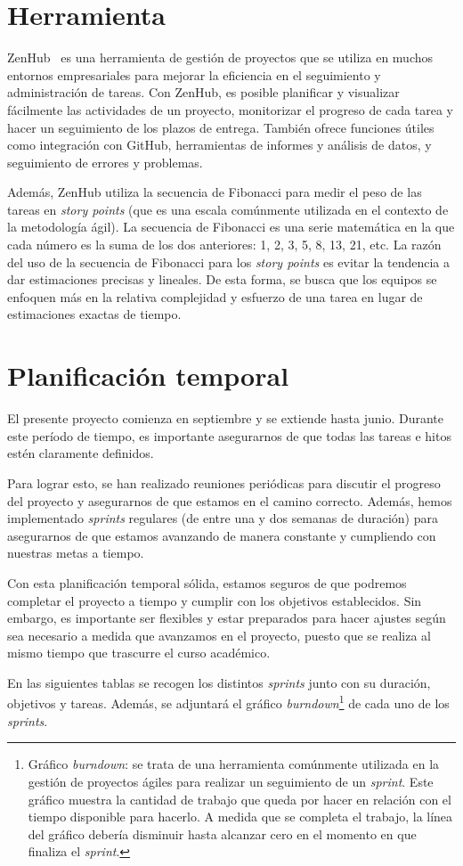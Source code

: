 \section{Herramienta}
ZenHub~\cite{Zenhub} es una herramienta de gestión de proyectos que se utiliza en muchos entornos empresariales para mejorar la eficiencia en el seguimiento y administración de tareas. Con ZenHub, es posible planificar y visualizar fácilmente las actividades de un proyecto, monitorizar el progreso de cada tarea y hacer un seguimiento de los plazos de entrega. También ofrece funciones útiles como integración con GitHub, herramientas de informes y análisis de datos, y seguimiento de errores y problemas.

Además, ZenHub utiliza la secuencia de Fibonacci para medir el peso de las tareas en \textit{story points} (que es una escala comúnmente utilizada en el contexto de la metodología ágil). La secuencia de Fibonacci es una serie matemática en la que cada número es la suma de los dos anteriores: 1, 2, 3, 5, 8, 13, 21, etc. La razón del uso de la secuencia de Fibonacci para los \textit{story points} es evitar la tendencia a dar estimaciones precisas y lineales. De esta forma, se busca que los equipos se enfoquen más en la relativa complejidad y esfuerzo de una tarea en lugar de estimaciones exactas de tiempo. 

\section{Planificación temporal}
El presente proyecto comienza en septiembre y se extiende hasta junio. Durante este período de tiempo, es importante asegurarnos de que todas las tareas e hitos estén claramente definidos.

Para lograr esto, se han realizado reuniones periódicas para discutir el progreso del proyecto y asegurarnos de que estamos en el camino correcto. Además, hemos implementado \textit{sprints} regulares (de entre una y dos semanas de duración) para asegurarnos de que estamos avanzando de manera constante y cumpliendo con nuestras metas a tiempo.

Con esta planificación temporal sólida, estamos seguros de que podremos completar el proyecto a tiempo y cumplir con los objetivos establecidos. Sin embargo, es importante ser flexibles y estar preparados para hacer ajustes según sea necesario a medida que avanzamos en el proyecto, puesto que se realiza al mismo tiempo que trascurre el curso académico.

En las siguientes tablas se recogen los distintos \textit{sprints} junto con su duración, objetivos y tareas. Además, se adjuntará el gráfico \textit{burndown}\footnote{Gráfico \textit{burndown}: se trata de una herramienta comúnmente utilizada en la gestión de proyectos ágiles para realizar un seguimiento de un \textit{sprint}. Este gráfico muestra la cantidad de trabajo que queda por hacer en relación con el tiempo disponible para hacerlo. A medida que se completa el trabajo, la línea del gráfico debería disminuir hasta alcanzar cero en el momento en que finaliza el \textit{sprint}.} de cada uno de los \textit{sprints}.


